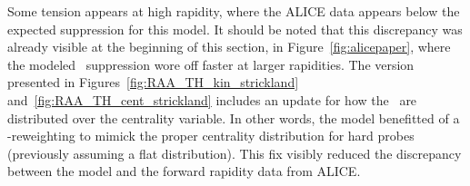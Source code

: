 Some tension appears at high rapidity, where the ALICE data appears
below the expected suppression for this model. It should be noted that
this discrepancy was already visible at the beginning of this section,
in Figure~\ref{fig:alicepaper}, where the modeled \PgUa\ suppression
wore off faster at larger rapidities. The version presented in
Figures~\ref{fig:RAA_TH_kin_strickland}
and~\ref{fig:RAA_TH_cent_strickland} includes an update for how
the \PgU\ are distributed over the centrality variable. In other
words, the model benefitted of a \Ncoll-reweighting to mimick the
proper centrality distribution for hard probes (previously assuming a
flat distribution). This fix visibly reduced the discrepancy between the model
and the forward rapidity data from ALICE.%







